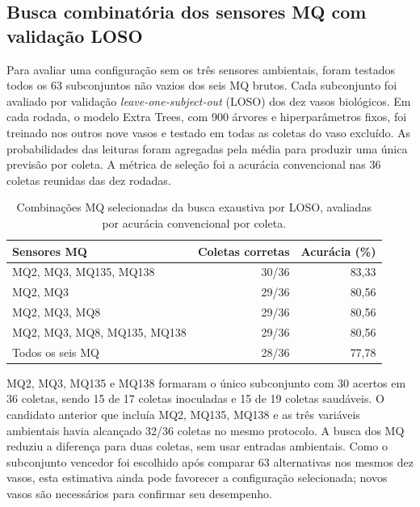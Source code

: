 \subsection{Busca combinatória dos sensores MQ com validação LOSO}

Para avaliar uma configuração sem os três sensores ambientais, foram testados
todos os 63 subconjuntos não vazios dos seis MQ brutos. Cada subconjunto foi
avaliado por validação \textit{leave-one-subject-out} (LOSO) dos dez vasos
biológicos. Em cada rodada, o modelo Extra Trees, com 900 árvores e
hiperparâmetros fixos, foi treinado nos outros nove vasos e testado em todas
as coletas do vaso excluído. As probabilidades das leituras foram agregadas
pela média para produzir uma única previsão por coleta. A métrica de seleção
foi a acurácia convencional nas 36 coletas reunidas das dez rodadas.

\begin{table}[htbp]
\centering
\caption{Combinações MQ selecionadas da busca exaustiva por LOSO, avaliadas
por acurácia convencional por coleta.}
\label{tab:busca_mq_loso}
\begin{tabular}{lrr}
\hline
Sensores MQ & Coletas corretas & Acurácia (\%) \\
\hline
MQ2, MQ3, MQ135, MQ138 & 30/36 & 83,33 \\
MQ2, MQ3 & 29/36 & 80,56 \\
MQ2, MQ3, MQ8 & 29/36 & 80,56 \\
MQ2, MQ3, MQ8, MQ135, MQ138 & 29/36 & 80,56 \\
Todos os seis MQ & 28/36 & 77,78 \\
\hline
\end{tabular}
\end{table}

MQ2, MQ3, MQ135 e MQ138 formaram o único subconjunto com 30 acertos em 36
coletas, sendo 15 de 17 coletas inoculadas e 15 de 19 coletas saudáveis.
O candidato anterior que incluía MQ2, MQ135, MQ138 e as três variáveis
ambientais havia alcançado 32/36 coletas no mesmo protocolo. A busca dos MQ
reduziu a diferença para duas coletas, sem usar entradas ambientais. Como o
subconjunto vencedor foi escolhido após comparar 63 alternativas nos mesmos
dez vasos, esta estimativa ainda pode favorecer a configuração selecionada;
novos vasos são necessários para confirmar seu desempenho.
